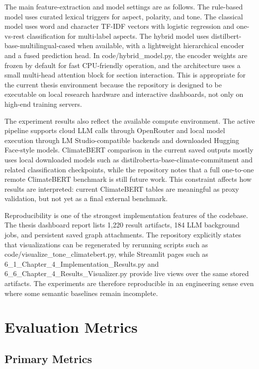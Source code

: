 The main feature-extraction and model settings are as follows. The rule-based model uses curated lexical triggers for aspect, polarity, and tone. The classical model uses word and character TF-IDF vectors with logistic regression and one-vs-rest classification for multi-label aspects. The hybrid model uses distilbert-base-multilingual-cased when available, with a lightweight hierarchical encoder and a fused prediction head. In code/hybrid\_model.py, the encoder weights are frozen by default for fast CPU-friendly operation, and the architecture uses a small multi-head attention block for section interaction. This is appropriate for the current thesis environment because the repository is designed to be executable on local research hardware and interactive dashboards, not only on high-end training servers.

The experiment results also reflect the available compute environment. The active pipeline supports cloud LLM calls through OpenRouter and local model execution through LM Studio-compatible backends and downloaded Hugging Face-style models. ClimateBERT comparison in the current saved outputs mostly uses local downloaded models such as distilroberta-base-climate-commitment and related classification checkpoints, while the repository notes that a full one-to-one remote ClimateBERT benchmark is still future work. This constraint affects how results are interpreted: current ClimateBERT tables are meaningful as proxy validation, but not yet as a final external benchmark.

Reproducibility is one of the strongest implementation features of the codebase. The thesis dashboard report lists 1,220 result artifacts, 184 LLM background jobs, and persistent saved graph attachments. The repository explicitly states that visualizations can be regenerated by rerunning scripts such as code/visualize\_tone\_climatebert.py, while Streamlit pages such as 6\_1\_Chapter\_4\_Implementation\_Results.py and 6\_6\_Chapter\_4\_Results\_Visualizer.py provide live views over the same stored artifacts. The experiments are therefore reproducible in an engineering sense even where some semantic baselines remain incomplete.
\section{Evaluation Metrics}
\subsection{Primary Metrics}

